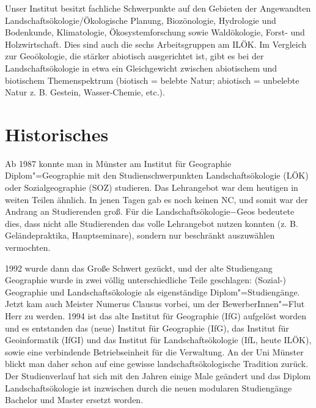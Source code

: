 Unser Institut besitzt fachliche Schwerpunkte auf den Gebieten der Angewandten Landschaftsökologie/Ökologische Planung, Biozönologie, Hydrologie und Bodenkunde, Klimatologie, Ökosystemforschung sowie Waldökologie, Forst- und Holzwirtschaft. Dies sind auch die sechs Arbeitsgruppen am ILÖK. Im Vergleich zur Geoökologie, die stärker abiotisch ausgerichtet ist, gibt es bei der Landschaftsökologie in etwa ein Gleichgewicht zwischen abiotischem und biotischem Themenspektrum (biotisch = belebte Natur; abiotisch = unbelebte Natur z. B. Gestein, Wasser-Chemie, etc.).

\section*{Historisches}
Ab 1987 konnte man in Münster am Institut für Geographie Diplom"=Geographie mit den Studienschwerpunkten Landschaftsökologie (LÖK) oder Sozialgeographie (SOZ) studieren. Das Lehrangebot war dem heutigen in weiten Teilen ähnlich. In jenen Tagen gab es noch keinen NC, und somit war der Andrang an Studierenden groß. Für die Landschaftsökologie−Geos bedeutete dies, dass nicht alle Studierenden das volle Lehrangebot nutzen konnten (z. B. Geländepraktika, Hauptseminare), sondern nur beschränkt auszuwählen vermochten.

1992 wurde dann das Große Schwert gezückt, und der alte Studiengang Geographie wurde in zwei völlig unterschiedliche Teile geschlagen: (Sozial-) Geographie und Landschaftsökologie als eigenständige Diplom"=Studiengänge. Jetzt kam auch Meister Numerus Clausus vorbei, um der BewerberInnen"=Flut Herr zu werden. 1994 ist das alte Institut für Geographie (IfG) aufgelöst worden und es entstanden das (neue) Institut für Geographie (IfG), das Institut für Geoinformatik (IfGI) und das Institut für Landschaftsökologie (IfL, heute ILÖK), sowie eine verbindende Betriebseinheit für die Verwaltung.
An der Uni Münster blickt man daher schon auf eine gewisse landschaftsökologische Tradition zurück. Der Studienverlauf hat sich mit den Jahren einige Male geändert und das Diplom Landschaftsökologie ist inzwischen durch die neuen modularen Studiengänge Bachelor und Master ersetzt worden.

